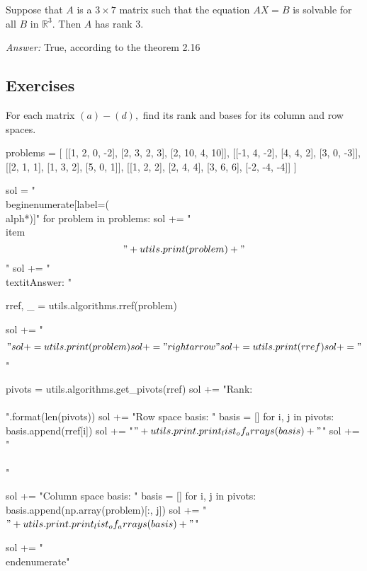 \documentclass[letterpaper]{article}
\newcommand{\ans}{\textit{Answer: }}
\newenvironment{question}[2][Question]{\begin{trivlist}
\item[\hskip \labelsep {\bfseries #1}\hskip \labelsep {\bfseries #2.}]}{\end{trivlist}}
\begin{document}
\begin{question}{2.25}
    Suppose that $A$ is a $3 \times 7$ matrix such that the equation $A X = B$ is solvable for
    all $B$ in $\mathbb { R } ^ { 3 } .$ Then $A$ has rank 3.

    \ans True, according to the theorem 2.16
\end{question}

\subsection{Exercises}

\begin{question}{2.66}
    For each matrix $( a ) - ( d ) ,$ find its rank and bases for its column and
    row spaces.

\begin{pycode}
problems = [
    [[1, 2, 0, -2], [2, 3, 2, 3], [2, 10, 4, 10]],
    [[-1, 4, -2], [4, 4, 2], [3, 0, -3]],
    [[2, 1, 1], [1, 3, 2], [5, 0, 1]],
    [[1, 2, 2], [2, 4, 4], [3, 6, 6], [-2, -4, -4]]
]

sol = "\\begin{enumerate}[label=(\\alph*)]\n"
for problem in problems:
    sol += "\\item $$ " + utils.print(problem) + " $$ \n"
    sol += "\\textit{Answer: } \n"

    rref, _ = utils.algorithms.rref(problem)

    sol += "$$ "
    sol += utils.print(problem)
    sol += "\\rightarrow"
    sol += utils.print(rref)
    sol += " $$ \n"

    pivots = utils.algorithms.get_pivots(rref)
    sol += "Rank: {} \\\\".format(len(pivots))
    sol += "Row space basis: "
    basis = []
    for i, j in pivots:
        basis.append(rref[i])
    sol += "$ " + utils.print.print_list_of_arrays(basis) + " $\n"
    sol += "\\\\"

    sol += "Column space basis: "
    basis = []
    for i, j in pivots:
        basis.append(np.array(problem)[:, j])
    sol += "$ " + utils.print.print_list_of_arrays(basis) + " $\n"

sol += "\\end{enumerate}"
\end{pycode}
    
\end{question}
\end{document}

